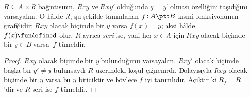 \begin{prop}
$R \subseteq A \times B$ bağıntısının, $Rxy$ ve $Rxy'$ olduğunda $y=y'$
olması özelliğini taşıdığını varsayalım. O hâlde $R$, şu şekilde tanımlanan
$f\colon A \pto B$ kısmi fonksiyonunun grafiğidir: $Rxy$ olacak biçimde bir
$y$ varsa $f(x)=y$; aksi hâlde $f(x) \fundefined$ olur. $R$ ayrıca
\emph{seri} ise, yani her $x \in A$ için $Rxy$ olacak biçimde bir $y \in B$
varsa, $f$ tümeldir.
\end{prop}

\begin{proof}
$Rxy$ olacak biçimde bir $y$ bulunduğunu varsayalım. $Rxy'$ olacak biçimde
başka bir $y'\neq y$ bulunsaydı $R$ üzerindeki koşul çiğnenirdi. Dolayısıyla
$Rxy$ olacak biçimde bir $y$ varsa bu $y$ biriciktir ve böylece $f$ iyi
tanımlıdır. Açıktır ki $R_f=R$'dir ve $R$ seri ise $f$ tümeldir.
\end{proof}

